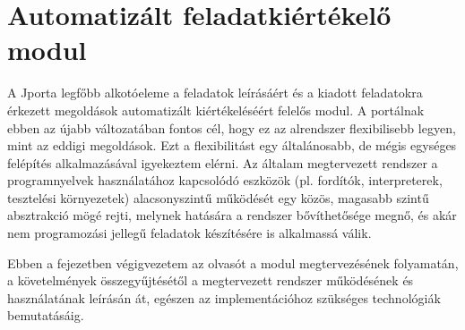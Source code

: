 \chapter{Automatizált feladatkiértékelő modul}\label{chapter:exercise}

A Jporta legfőbb alkotóeleme a feladatok leírásáért és a kiadott feladatokra érkezett megoldások automatizált kiértékeléséért felelős modul.
A portálnak ebben az újabb változatában fontos cél, hogy ez az alrendszer flexibilisebb legyen, mint az eddigi megoldások.
Ezt a flexibilitást egy általánosabb, de mégis egységes felépítés alkalmazásával igyekeztem elérni.
Az általam megtervezett rendszer a programnyelvek használatához kapcsolódó eszközök (pl. fordítók, interpreterek, tesztelési környezetek) alacsonyszintű működését egy közös, magasabb szintű absztrakció mögé rejti, melynek hatására a rendszer bővíthetősége megnő, és akár nem programozási jellegű feladatok készítésére is alkalmassá válik.

Ebben a fejezetben végigvezetem az olvasót a modul megtervezésének folyamatán, a követelmények összegyűjtésétől a megtervezett rendszer működésének és használatának leírásán át, egészen az implementációhoz szükséges technológiák bemutatásáig.

